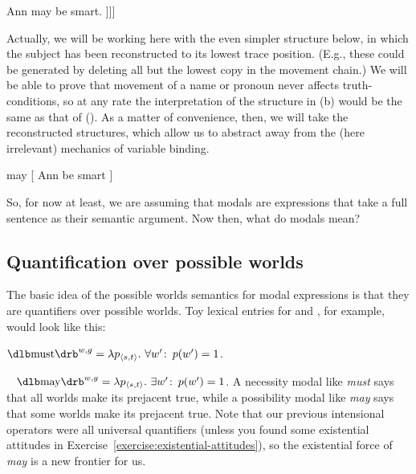 \pex
\a Ann may be smart. 
\a\null [ Ann [ $\lambda_1$ [ may [ t$_1$ be smart ]]]]
\xe

Actually, we will be working here with the even simpler structure below, in
which the subject has been reconstructed to its lowest trace position. (E.g.,
these could be generated by deleting all but the lowest copy in the movement
chain.) We will be
able to prove that movement of a name or pronoun never affects truth-conditions,
so at any rate the interpretation of the structure in (\lastx b) would be the
same as that of (\nextx). As a matter of convenience, %
%
then, we will take the reconstructed structures, which allow us to abstract away
from the (here irrelevant) mechanics of variable binding.

\ex may [ Ann be smart ] \xe

So, for now at least, we are assuming that modals are expressions that take a
full sentence as their semantic argument. Now then, what do modals mean?

\subsection{Quantification over possible worlds} \label{sec:quant-over-poss}

%
The basic idea of the possible worlds semantics for modal expressions is that they
are quantifiers over possible worlds. Toy lexical entries for 
and , for example, would look like this:

\ex $\sv{\mbox{must}}^{w,g} = \lambda p_{\type{s,t}}.\ \forall w'\co p(w') =
1$. \xe

\ex~ $\sv{\mbox{may}}^{w,g} = \lambda p_{\type{s,t}}.\ \exists w'\co p(w') =
1$. \xe
%
%
A necessity modal like \emph{must} says that all worlds make its prejacent true,
while a possibility modal like \emph{may} says that some worlds make its
prejacent true. Note that our previous intensional operators were all universal
quantifiers (unless you found some existential attitudes in
Exercise~\ref{exercise:existential-attitudes}), so the existential force of
\emph{may} is a new frontier for us.

